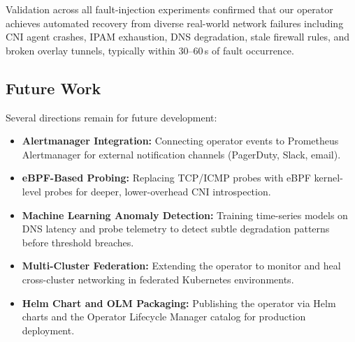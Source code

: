 \documentclass[conference]{IEEEtran}
\begin{document}
Validation across all fault-injection experiments confirmed that our operator achieves automated recovery from diverse real-world network failures including CNI agent crashes, IPAM exhaustion, DNS degradation, stale firewall rules, and broken overlay tunnels, typically within 30--60\,s of fault occurrence.

\subsection{Future Work}
Several directions remain for future development:
\begin{itemize}
  \item \textbf{Alertmanager Integration:} Connecting operator events to Prometheus Alertmanager for external notification channels (PagerDuty, Slack, email).
  \item \textbf{eBPF-Based Probing:} Replacing TCP/ICMP probes with eBPF kernel-level probes for deeper, lower-overhead CNI introspection.
  \item \textbf{Machine Learning Anomaly Detection:} Training time-series models on DNS latency and probe telemetry to detect subtle degradation patterns before threshold breaches.
  \item \textbf{Multi-Cluster Federation:} Extending the operator to monitor and heal cross-cluster networking in federated Kubernetes environments.
  \item \textbf{Helm Chart and OLM Packaging:} Publishing the operator via Helm charts and the Operator Lifecycle Manager catalog for production deployment.
\end{itemize}

\balance


\end{document}
